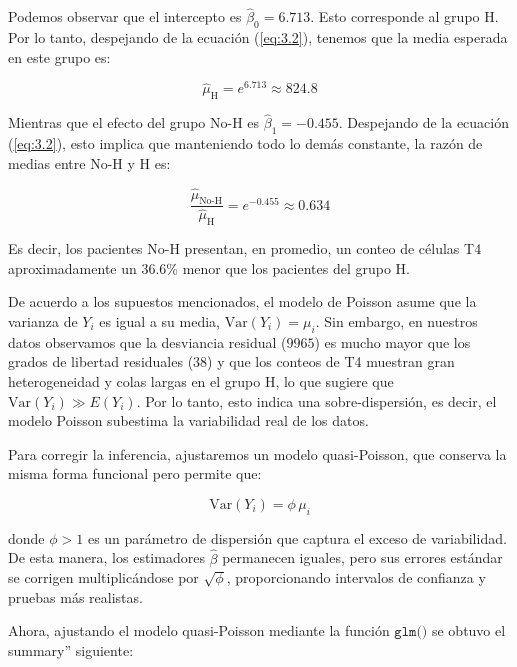 Podemos observar que el intercepto es $\widehat{\beta}_0 = 6.713$. Esto corresponde al grupo H. Por lo tanto, despejando de la ecuación (\ref{eq:3.2}), tenemos que la media esperada en este grupo es:

\begin{equation*}
    \widehat{\mu}_{\text{H}} = e^{6.713} \approx 824.8
\end{equation*}

Mientras que el efecto del grupo No-H es $\widehat{\beta}_1 = -0.455$. Despejando de la ecuación (\ref{eq:3.2}), esto implica que manteniendo todo lo demás constante, la razón de medias entre No-H y H es:

\begin{equation*}
    \frac{\widehat{\mu}_{\text{No-H}}}{\widehat{\mu}_{\text{H}}} = e^{-0.455} \approx 0.634
\end{equation*}

Es decir, los pacientes No-H presentan, en promedio, un conteo de células T4 aproximadamente un 36.6\% menor que los pacientes del grupo H. 

De acuerdo a los supuestos mencionados, el modelo de Poisson asume que la varianza de $Y_i$ es igual a su media, $\mathrm{Var}(Y_i)=\mu_i$. Sin embargo, en nuestros datos observamos que la desviancia residual ($9965$) es mucho mayor que los grados de libertad residuales ($38$) y que los conteos de T4 muestran gran heterogeneidad y colas largas en el grupo H, lo que sugiere que $\mathrm{Var}(Y_i) \gg E(Y_i)$. Por lo tanto, esto indica una sobre-dispersión, es decir, el modelo Poisson subestima la variabilidad real de los datos.

Para corregir la inferencia, ajustaremos un modelo quasi-Poisson, que conserva la misma forma funcional pero permite que:

\begin{equation*}
    \mathrm{Var}(Y_i) = \phi \, \mu_i
\end{equation*}

donde $\phi > 1$ es un parámetro de dispersión que captura el exceso de variabilidad. De esta manera, los estimadores $\widehat{\beta}$ permanecen iguales, pero sus errores estándar se corrigen multiplicándose por $\sqrt{\phi}$, proporcionando intervalos de confianza y pruebas más realistas.

Ahora, ajustando el modelo quasi-Poisson mediante la función $\texttt{glm()}$ se obtuvo el summary'' siguiente:

